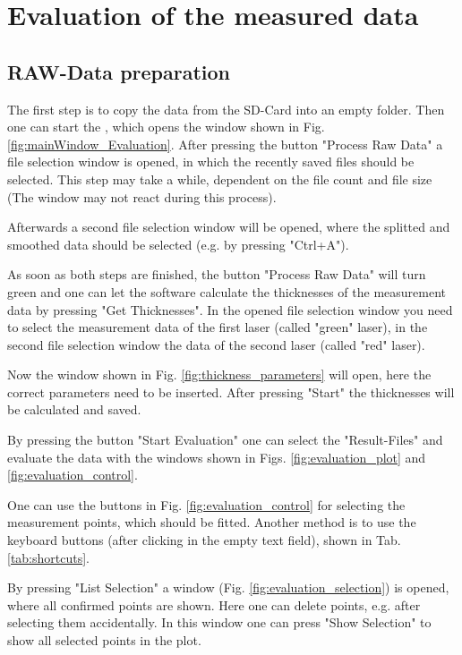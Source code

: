 \chapter{Evaluation of the measured data}

\section{RAW-Data preparation}

The first step is to copy the data from the SD-Card into an empty folder. 
Then one can start the , which opens the window shown in Fig. \ref{fig:mainWindow_Evaluation}. After pressing the button "Process Raw Data" a file selection window is opened, in which the recently saved files should be selected. This step may take a while, dependent on the file count and file size (The window may not react during this process). 

Afterwards a second file selection window will be opened, where the splitted and smoothed data should be selected (e.g. by pressing "Ctrl+A"). 

As soon as both steps are finished, the button "Process Raw Data" will turn green and one can let the software calculate the thicknesses of the measurement data by pressing "Get Thicknesses". 
In the opened file selection window you need to select the measurement data of the first laser (called "green" laser), in the second file selection window the data of the second laser (called "red" laser). 

Now the window shown in Fig. \ref{fig:thickness_parameters} will open, here the correct parameters need to be inserted. After pressing "Start" the thicknesses will be calculated and saved. 

By pressing the button "Start Evaluation" one can select the "Result-Files" and evaluate the data with the windows shown in Figs. \ref{fig:evaluation_plot} and \ref{fig:evaluation_control}.

One can use the buttons in Fig. \ref{fig:evaluation_control} for selecting the measurement points, which should be fitted. Another method is to use the keyboard buttons (after clicking in the empty text field), shown in Tab. \ref{tab:shortcuts}. 

By pressing "List Selection" a window (Fig. \ref{fig:evaluation_selection}) is opened, where all confirmed points are shown. Here one can delete points, e.g. after selecting them accidentally. 
In this window one can press "Show Selection" to show all selected points in the plot.

